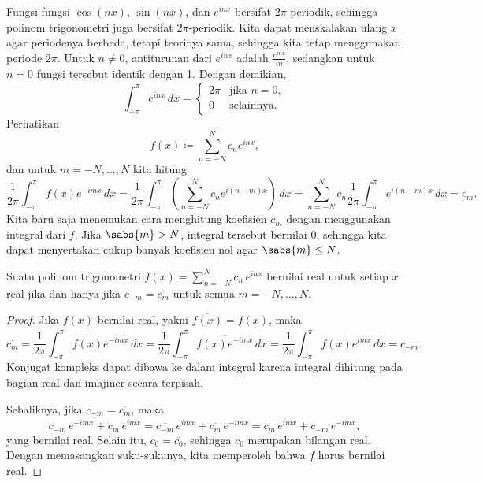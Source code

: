 \medskip

Fungsi-fungsi $\cos (nx)$, $\sin (nx)$, dan $e^{inx}$ bersifat
$2\pi$-periodik, sehingga
polinom
trigonometri juga bersifat $2\pi$-periodik.
Kita dapat menskalakan ulang $x$ agar periodenya berbeda, tetapi teorinya
sama, sehingga kita tetap menggunakan periode $2\pi$.
Untuk $n \neq 0$, antiturunan dari $e^{inx}$ adalah $\frac{e^{inx}}{in}$,
sedangkan untuk $n=0$ fungsi tersebut identik dengan 1. Dengan demikian,
\begin{equation*}
\int_{-\pi}^\pi e^{inx} \, dx =
\begin{cases}
2\pi & \text{jika } n=0, \\
0    & \text{selainnya.}
\end{cases}
\end{equation*}
Perhatikan
\begin{equation*}
f(x) \coloneqq \sum_{n=-N}^N c_n e^{inx} ,
\end{equation*}
dan untuk $m=-N,\ldots,N$ kita hitung
\begin{equation*}
\frac{1}{2\pi} \int_{-\pi}^\pi
f(x) e^{-imx} \, dx
=
\frac{1}{2\pi} \int_{-\pi}^\pi
\left(\sum_{n=-N}^N c_n e^{i(n-m)x}\right) \, dx
=
\sum_{n=-N}^N
c_n
\frac{1}{2\pi}
\int_{-\pi}^\pi
e^{i(n-m)x}
 \, dx
=
c_m .
\end{equation*}
Kita baru saja menemukan cara menghitung koefisien $c_m$ dengan menggunakan integral
dari $f$. Jika $\sabs{m} > N$, integral tersebut bernilai 0, sehingga kita dapat
menyertakan cukup banyak koefisien nol agar $\sabs{m} \leq N$.

\begin{prop}
Suatu polinom trigonometri
$f(x) = \sum_{n=-N}^N c_n\, e^{inx}$
bernilai real untuk setiap $x$ real jika dan hanya jika
$c_{-m} = \overline{c_m}$ untuk semua $m=-N,\ldots,N$.
\end{prop}

\begin{proof}
Jika $f(x)$ bernilai real, yakni $\overline{f(x)} = f(x)$, maka
\begin{equation*}
\overline{c_m}
=
\overline{
\frac{1}{2\pi} \int_{-\pi}^\pi
f(x) e^{-imx} \, dx
}
=
\frac{1}{2\pi} \int_{-\pi}^\pi
\overline{
f(x) e^{-imx} } \, dx
=
\frac{1}{2\pi} \int_{-\pi}^\pi
f(x) e^{imx} \, dx
= c_{-m} .
\end{equation*}
Konjugat kompleks dapat dibawa ke dalam integral karena integral dihitung
pada bagian real dan imajiner secara terpisah.

Sebaliknya, jika
$c_{-m} = \overline{c_m}$, maka
\begin{equation*}
\overline{c_{-m}\, e^{-imx}+ c_{m}\, e^{imx}}
=
\overline{c_{-m}}\, e^{imx}+ \overline{c_{m}}\, e^{-imx}
=
c_{m}\, e^{imx}+ c_{-m}\, e^{-imx} ,
\end{equation*}
yang bernilai real. Selain itu, $c_0 = \overline{c_0}$, sehingga
$c_0$ merupakan bilangan real.
Dengan memasangkan suku-sukunya, kita memperoleh bahwa $f$ harus bernilai real.
\end{proof}

